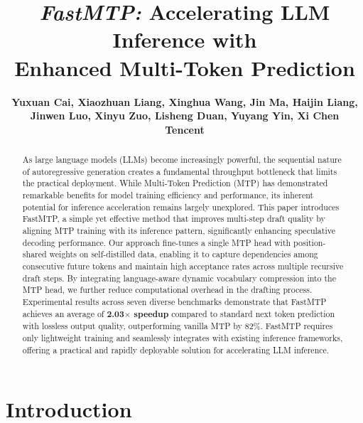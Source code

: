 \documentclass{article} %
\title{\textit{FastMTP:} Accelerating LLM Inference with \\Enhanced Multi-Token Prediction}
\author{
  \bf Yuxuan Cai, Xiaozhuan Liang, Xinghua Wang, Jin Ma, Haijin Liang, Jinwen Luo, Xinyu Zuo, Lisheng Duan, Yuyang Yin, Xi Chen\\
  \vspace{0.5em}
  Tencent
}
\begin{document}
\maketitle

\begin{abstract}
As large language models (LLMs) become increasingly powerful, the sequential nature of autoregressive generation creates a fundamental throughput bottleneck that limits the practical deployment. While Multi-Token Prediction (MTP) has demonstrated remarkable benefits for model training efficiency and performance, its inherent potential for inference acceleration remains largely unexplored. This paper introduces FastMTP, a simple yet effective method that improves multi-step draft quality by aligning MTP training with its inference pattern, significantly enhancing speculative decoding performance. Our approach fine-tunes a single MTP head with position-shared weights on self-distilled data, enabling it to capture dependencies among consecutive future tokens and maintain high acceptance rates across multiple recursive draft steps. By integrating language-aware dynamic vocabulary compression into the MTP head, we further reduce computational overhead in the drafting process. Experimental results across seven diverse benchmarks demonstrate that FastMTP achieves an average of \textbf{2.03$\times$ speedup} compared to standard next token prediction with lossless output quality, outperforming vanilla MTP by 82\%. FastMTP requires only lightweight training and seamlessly integrates with existing inference frameworks, offering a practical and rapidly deployable solution for accelerating LLM inference.
\end{abstract}


\vspace{-15pt}


\section{Introduction}
\end{document}
